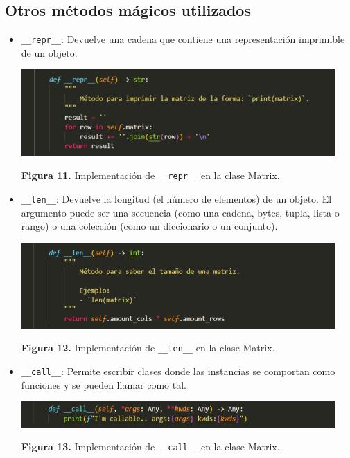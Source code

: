 \documentclass[10pt]{article} %
\newcommand{\imgcaption}[2]{\tiny \textbf{Figura #1.} #2.}
\newcommand{\mgc}[2][]{\colorbox{backcolour}{\texttt{\_\_#2\_\_#1}}}
\newcommand{\mgccapt}[1]{\texttt{\_\_#1\_\_}}
\begin{document}
\subsection{Otros m\'etodos m\'agicos utilizados}

\begin{itemize}
	\item \mgc{repr}: Devuelve una cadena que contiene una representación imprimible de un objeto.
	
	\begin{center}
		\includegraphics[width=12cm]{repr.png}
		
		\imgcaption{11}{Implementaci\'on de \mgccapt{repr} en la clase Matrix}
	\end{center}

	\item \mgc{len}: Devuelve la longitud (el número de elementos) de un objeto. El argumento puede ser una secuencia (como una cadena, bytes, tupla, lista o rango) o una colección (como un diccionario o un conjunto).
	
	\begin{center}
		\includegraphics[width=12cm]{len.png}
		
		\imgcaption{12}{Implementaci\'on de \mgccapt{len} en la clase Matrix}
	\end{center}

	\item \mgc{call}: Permite escribir clases donde las instancias se comportan como funciones y se pueden llamar como tal.
	
	\begin{center}
		\includegraphics[width=12cm]{call.png}
		
		\imgcaption{13}{Implementaci\'on de \mgccapt{call} en la clase Matrix}
	\end{center}
	
	
	
\end{itemize}

\end{document}
